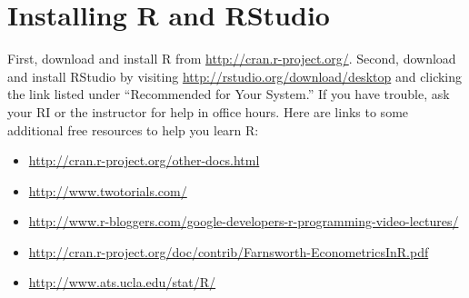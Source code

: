 \documentclass[11pt, letterpaper]{article}
\begin{document}
\section*{Installing R and RStudio} First, download and install R from \url{http://cran.r-project.org/}. Second, download and install RStudio by visiting \url{http://rstudio.org/download/desktop} and clicking the link listed under ``Recommended for Your System.'' 
If you have trouble, ask your RI or the instructor for help in office hours.
Here are links to some additional free resources to help you learn R:
\begin{itemize}
		       \item \url{http://cran.r-project.org/other-docs.html}
\item \url{http://www.twotorials.com/}
			\item \url{http://www.r-bloggers.com/google-developers-r-programming-video-lectures/}
		 	\item \url{http://cran.r-project.org/doc/contrib/Farnsworth-EconometricsInR.pdf}
 			\item \url{http://www.ats.ucla.edu/stat/R/}
\end{itemize}


\newpage


\end{document}

